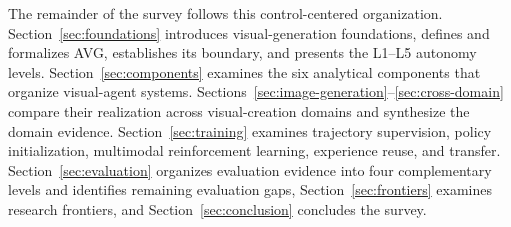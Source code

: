 The remainder of the survey follows this control-centered organization. Section~\ref{sec:foundations} introduces visual-generation foundations, defines and formalizes AVG, establishes its boundary, and presents the L1--L5 autonomy levels. Section~\ref{sec:components} examines the six analytical components that organize visual-agent systems. Sections~\ref{sec:image-generation}--\ref{sec:cross-domain} compare their realization across visual-creation domains and synthesize the domain evidence. Section~\ref{sec:training} examines trajectory supervision, policy initialization, multimodal reinforcement learning, experience reuse, and transfer. Section~\ref{sec:evaluation} organizes evaluation evidence into four complementary levels and identifies remaining evaluation gaps, Section~\ref{sec:frontiers} examines research frontiers, and Section~\ref{sec:conclusion} concludes the survey.
